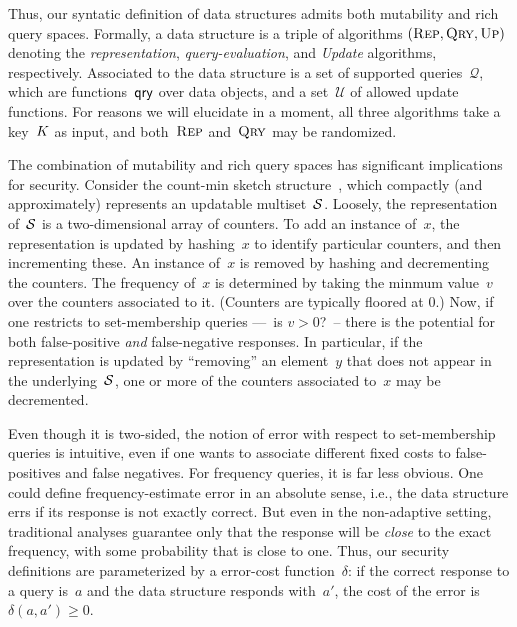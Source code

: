 Thus, our syntatic definition of data structures admits both mutability and rich
query spaces.  Formally, a data structure is a triple of algorithms $(\textnormal{\textsc{Rep}},
\textnormal{\textsc{Qry}}, \textnormal{\textsc{Up}})$ denoting the \emph{representation}, \emph{query-evaluation}, and
\emph{Update} algorithms, respectively. Associated to the data structure is a
set of supported queries~$\mathcal{Q}$, which are functions~$\mathsf{qry}$ over data
objects, and a set~$\mathcal{U}$ of allowed update functions.  For reasons we
will elucidate in a moment, all three algorithms take a key~$K$ as input, and
both~$\textnormal{\textsc{Rep}}$ and~$\textnormal{\textsc{Qry}}$ may be randomized.


The combination of mutability and rich query spaces has significant
implications for security.  Consider the count-min
sketch structure~\cite{cormode2005improved}, which compactly (and approximately)
represents an updatable multiset~$\mathcal{S}$.  
Loosely, the representation of~$\mathcal{S}$ is a two-dimensional array
of counters. To add an instance of~$x$, the representation is
updated by hashing~$x$ to identify particular counters, and then
incrementing these.  An instance of~$x$ is removed
by hashing and decrementing the counters.
The frequency of~$x$ is determined by taking
the minmum value~$v$ over the counters associated to it. (Counters are
typically floored at 0.)  Now, if one
restricts to set-membership queries ---~is $v>0$?~-- there is the
potential for both false-positive \emph{and} false-negative
responses.  In particular, if the representation is updated by
``removing'' an element~$y$ that does not appear in the
underlying~$\mathcal{S}$, one or more of the counters associated to~$x$ may
be decremented.

Even though it is two-sided, the notion of error with respect to set-membership
queries is intuitive, even if one wants to associate different
fixed costs to false-positives and false negatives.  For frequency
queries, it is far less obvious.   One could define frequency-estimate
error in an absolute sense, i.e., the data structure errs if its
response is not exactly correct.  But even in the non-adaptive
setting, traditional analyses guarantee only that the response will be
\emph{close} to the exact frequency, with some probability that is close
to one.  Thus, our security definitions are parameterized by a
error-cost function~$\delta$: if the correct response to a query is~$a$ and
the data structure responds with~$a'$, the cost of the error is
$\delta(a,a') \geq 0$.

